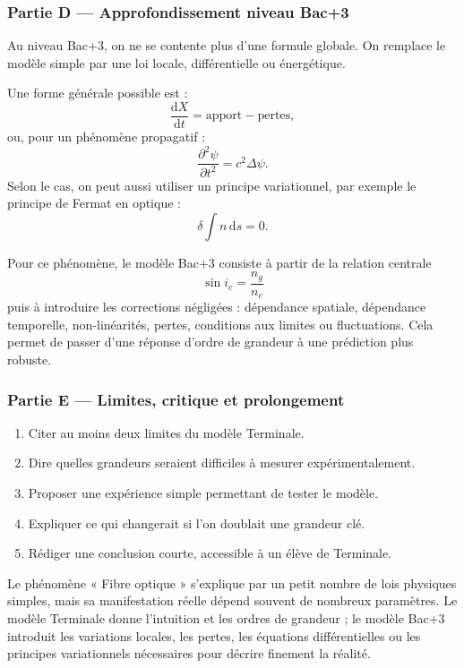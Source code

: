 \documentclass[11pt,a4paper]{article}
\begin{document}
\subsubsection*{Partie D — Approfondissement niveau Bac+3}

\begin{approfondissementbox}
Au niveau Bac+3, on ne se contente plus d'une formule globale. On remplace le modèle simple par une loi locale, différentielle ou énergétique.

Une forme générale possible est :
\[
\frac{\mathrm d X}{\mathrm dt}=\text{apport}-\text{pertes},
\]
ou, pour un phénomène propagatif :
\[
\frac{\partial^2 \psi}{\partial t^2}=c^2\Delta\psi.
\]
Selon le cas, on peut aussi utiliser un principe variationnel, par exemple le principe de Fermat en optique :
\[
\delta \int n\,\mathrm ds=0.
\]

Pour ce phénomène, le modèle Bac+3 consiste à partir de la relation centrale
\[
\sin i_c=\frac{n_g}{n_c}
\]
puis à introduire les corrections négligées : dépendance spatiale, dépendance temporelle, non-linéarités, pertes, conditions aux limites ou fluctuations. Cela permet de passer d'une réponse d'ordre de grandeur à une prédiction plus robuste.
\end{approfondissementbox}

\subsubsection*{Partie E — Limites, critique et prolongement}

\begin{enumerate}
  \item Citer au moins deux limites du modèle Terminale.
  \item Dire quelles grandeurs seraient difficiles à mesurer expérimentalement.
  \item Proposer une expérience simple permettant de tester le modèle.
  \item Expliquer ce qui changerait si l'on doublait une grandeur clé.
  \item Rédiger une conclusion courte, accessible à un élève de Terminale.
\end{enumerate}

\begin{corrigebox}
Le phénomène « Fibre optique » s'explique par un petit nombre de lois physiques simples, mais sa manifestation réelle dépend souvent de nombreux paramètres. Le modèle Terminale donne l'intuition et les ordres de grandeur ; le modèle Bac+3 introduit les variations locales, les pertes, les équations différentielles ou les principes variationnels nécessaires pour décrire finement la réalité.
\end{corrigebox}
\end{document}
